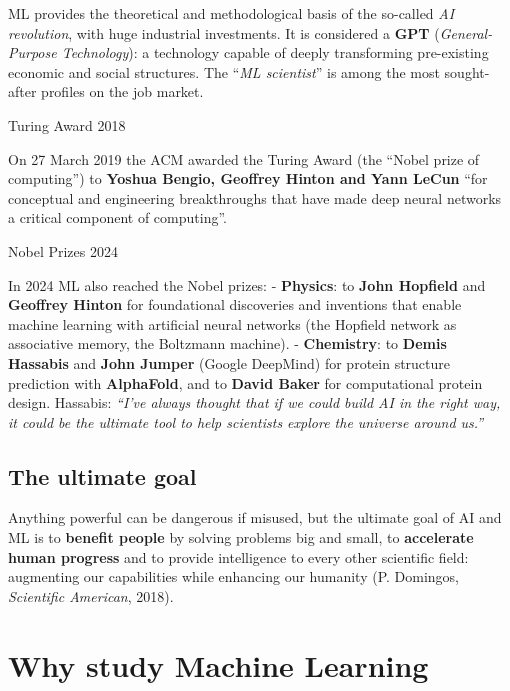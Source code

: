 ML provides the theoretical and methodological basis of the so-called
\emph{AI revolution}, with huge industrial investments. It is
considered a \textbf{GPT} (\emph{General-Purpose Technology}): a
technology capable of deeply transforming pre-existing economic and
social structures. The ``\emph{ML scientist}'' is among the most
sought-after profiles on the job market.

\begin{boxnote}{Turing Award 2018}

On 27 March 2019 the ACM awarded the Turing Award (the ``Nobel prize
of computing'') to \textbf{Yoshua Bengio, Geoffrey Hinton and Yann
LeCun} ``for conceptual and engineering breakthroughs that have made
deep neural networks a critical component of computing''.

\end{boxnote}

\begin{boxnote}{Nobel Prizes 2024}

In 2024 ML also reached the Nobel prizes: - \textbf{Physics}: to
\textbf{John Hopfield} and \textbf{Geoffrey Hinton} for foundational
discoveries and inventions that enable machine learning with artificial
neural networks (the Hopfield network as associative memory, the
Boltzmann machine). - \textbf{Chemistry}: to \textbf{Demis Hassabis}
and \textbf{John Jumper} (Google DeepMind) for protein structure
prediction with \textbf{AlphaFold}, and to \textbf{David Baker} for
computational protein design. Hassabis: \emph{``I've always thought
that if we could build AI in the right way, it could be the ultimate
tool to help scientists explore the universe around us.''}

\end{boxnote}

\subsection{The ultimate goal}\label{lo-scopo-ultimo}

Anything powerful can be dangerous if misused, but the ultimate goal
of AI and ML is to \textbf{benefit people} by solving problems big and
small, to \textbf{accelerate human progress} and to provide
intelligence to every other scientific field: augmenting our
capabilities while enhancing our humanity (P. Domingos,
\emph{Scientific American}, 2018).

\section{Why study Machine
Learning}\label{perchuxe9-studiare-il-machine-learning}

